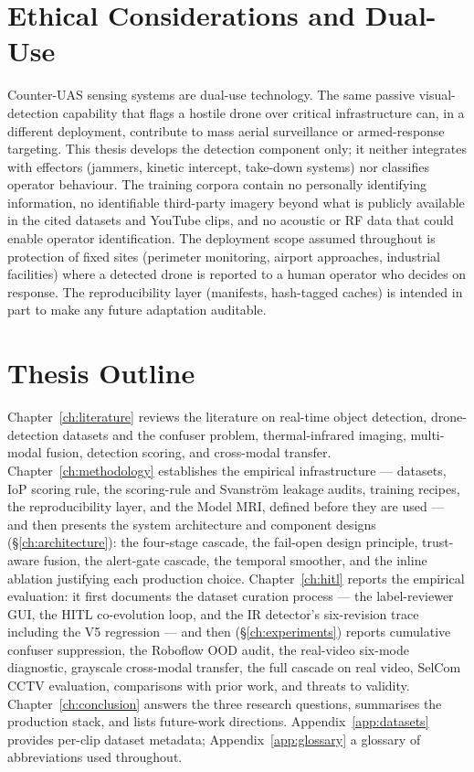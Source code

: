 \section{Ethical Considerations and Dual-Use}
\label{sec:ethics}

Counter-UAS sensing systems are dual-use technology. The same passive visual-detection capability that flags a hostile drone over critical infrastructure can, in a different deployment, contribute to mass aerial surveillance or armed-response targeting. This thesis develops the detection component only; it neither integrates with effectors (jammers, kinetic intercept, take-down systems) nor classifies operator behaviour. The training corpora contain no personally identifying information, no identifiable third-party imagery beyond what is publicly available in the cited datasets and YouTube clips, and no acoustic or RF data that could enable operator identification. The deployment scope assumed throughout is protection of fixed sites (perimeter monitoring, airport approaches, industrial facilities) where a detected drone is reported to a human operator who decides on response. The reproducibility layer (manifests, hash-tagged caches) is intended in part to make any future adaptation auditable.

\section{Thesis Outline}
\label{sec:outline}

Chapter~\ref{ch:literature} reviews the literature on real-time object detection, drone-detection datasets and the confuser problem, thermal-infrared imaging, multi-modal fusion, detection scoring, and cross-modal transfer. Chapter~\ref{ch:methodology} establishes the empirical infrastructure --- datasets, IoP scoring rule, the scoring-rule and Svanstr\"om leakage audits, training recipes, the reproducibility layer, and the Model MRI, defined before they are used --- and then presents the system architecture and component designs (\S\ref{ch:architecture}): the four-stage cascade, the fail-open design principle, trust-aware fusion, the alert-gate cascade, the temporal smoother, and the inline ablation justifying each production choice. Chapter~\ref{ch:hitl} reports the empirical evaluation: it first documents the dataset curation process --- the label-reviewer GUI, the HITL co-evolution loop, and the IR detector's six-revision trace including the V5 regression --- and then (\S\ref{ch:experiments}) reports cumulative confuser suppression, the Roboflow OOD audit, the real-video six-mode diagnostic, grayscale cross-modal transfer, the full cascade on real video, SelCom CCTV evaluation, comparisons with prior work, and threats to validity. Chapter~\ref{ch:conclusion} answers the three research questions, summarises the production stack, and lists future-work directions. Appendix~\ref{app:datasets} provides per-clip dataset metadata; Appendix~\ref{app:glossary} a glossary of abbreviations used throughout.


